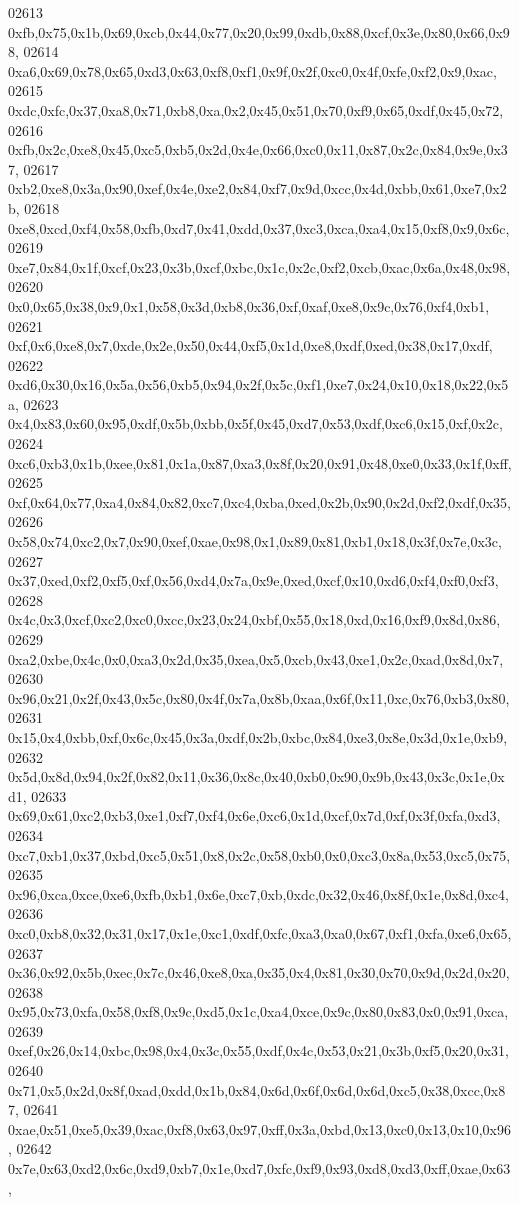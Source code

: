 \begin{DoxyCode}
02613   0xfb,0x75,0x1b,0x69,0xcb,0x44,0x77,0x20,0x99,0xdb,0x88,0xcf,0x3e,0x80,0x66,0x98,
02614   0xa6,0x69,0x78,0x65,0xd3,0x63,0xf8,0xf1,0x9f,0x2f,0xc0,0x4f,0xfe,0xf2,0x9,0xac,
02615   0xdc,0xfc,0x37,0xa8,0x71,0xb8,0xa,0x2,0x45,0x51,0x70,0xf9,0x65,0xdf,0x45,0x72,
02616   0xfb,0x2c,0xe8,0x45,0xc5,0xb5,0x2d,0x4e,0x66,0xc0,0x11,0x87,0x2c,0x84,0x9e,0x37,
02617   0xb2,0xe8,0x3a,0x90,0xef,0x4e,0xe2,0x84,0xf7,0x9d,0xcc,0x4d,0xbb,0x61,0xe7,0x2b,
02618   0xe8,0xcd,0xf4,0x58,0xfb,0xd7,0x41,0xdd,0x37,0xc3,0xca,0xa4,0x15,0xf8,0x9,0x6c,
02619   0xe7,0x84,0x1f,0xcf,0x23,0x3b,0xcf,0xbc,0x1c,0x2c,0xf2,0xcb,0xac,0x6a,0x48,0x98,
02620   0x0,0x65,0x38,0x9,0x1,0x58,0x3d,0xb8,0x36,0xf,0xaf,0xe8,0x9c,0x76,0xf4,0xb1,
02621   0xf,0x6,0xe8,0x7,0xde,0x2e,0x50,0x44,0xf5,0x1d,0xe8,0xdf,0xed,0x38,0x17,0xdf,
02622   0xd6,0x30,0x16,0x5a,0x56,0xb5,0x94,0x2f,0x5c,0xf1,0xe7,0x24,0x10,0x18,0x22,0x5a,
02623   0x4,0x83,0x60,0x95,0xdf,0x5b,0xbb,0x5f,0x45,0xd7,0x53,0xdf,0xc6,0x15,0xf,0x2c,
02624   0xc6,0xb3,0x1b,0xee,0x81,0x1a,0x87,0xa3,0x8f,0x20,0x91,0x48,0xe0,0x33,0x1f,0xff,
02625   0xf,0x64,0x77,0xa4,0x84,0x82,0xc7,0xc4,0xba,0xed,0x2b,0x90,0x2d,0xf2,0xdf,0x35,
02626   0x58,0x74,0xc2,0x7,0x90,0xef,0xae,0x98,0x1,0x89,0x81,0xb1,0x18,0x3f,0x7e,0x3c,
02627   0x37,0xed,0xf2,0xf5,0xf,0x56,0xd4,0x7a,0x9e,0xed,0xcf,0x10,0xd6,0xf4,0xf0,0xf3,
02628   0x4c,0x3,0xcf,0xc2,0xc0,0xcc,0x23,0x24,0xbf,0x55,0x18,0xd,0x16,0xf9,0x8d,0x86,
02629   0xa2,0xbe,0x4c,0x0,0xa3,0x2d,0x35,0xea,0x5,0xcb,0x43,0xe1,0x2c,0xad,0x8d,0x7,
02630   0x96,0x21,0x2f,0x43,0x5c,0x80,0x4f,0x7a,0x8b,0xaa,0x6f,0x11,0xc,0x76,0xb3,0x80,
02631   0x15,0x4,0xbb,0xf,0x6c,0x45,0x3a,0xdf,0x2b,0xbc,0x84,0xe3,0x8e,0x3d,0x1e,0xb9,
02632   0x5d,0x8d,0x94,0x2f,0x82,0x11,0x36,0x8c,0x40,0xb0,0x90,0x9b,0x43,0x3c,0x1e,0xd1,
02633   0x69,0x61,0xc2,0xb3,0xe1,0xf7,0xf4,0x6e,0xc6,0x1d,0xcf,0x7d,0xf,0x3f,0xfa,0xd3,
02634   0xc7,0xb1,0x37,0xbd,0xc5,0x51,0x8,0x2c,0x58,0xb0,0x0,0xc3,0x8a,0x53,0xc5,0x75,
02635   0x96,0xca,0xce,0xe6,0xfb,0xb1,0x6e,0xc7,0xb,0xdc,0x32,0x46,0x8f,0x1e,0x8d,0xc4,
02636   0xc0,0xb8,0x32,0x31,0x17,0x1e,0xc1,0xdf,0xfc,0xa3,0xa0,0x67,0xf1,0xfa,0xe6,0x65,
02637   0x36,0x92,0x5b,0xec,0x7c,0x46,0xe8,0xa,0x35,0x4,0x81,0x30,0x70,0x9d,0x2d,0x20,
02638   0x95,0x73,0xfa,0x58,0xf8,0x9c,0xd5,0x1c,0xa4,0xce,0x9c,0x80,0x83,0x0,0x91,0xca,
02639   0xef,0x26,0x14,0xbc,0x98,0x4,0x3c,0x55,0xdf,0x4c,0x53,0x21,0x3b,0xf5,0x20,0x31,
02640   0x71,0x5,0x2d,0x8f,0xad,0xdd,0x1b,0x84,0x6d,0x6f,0x6d,0x6d,0xc5,0x38,0xcc,0x87,
02641   0xae,0x51,0xe5,0x39,0xac,0xf8,0x63,0x97,0xff,0x3a,0xbd,0x13,0xc0,0x13,0x10,0x96,
02642   0x7e,0x63,0xd2,0x6c,0xd9,0xb7,0x1e,0xd7,0xfc,0xf9,0x93,0xd8,0xd3,0xff,0xae,0x63,

\end{DoxyCode}
